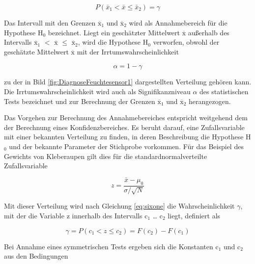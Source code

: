 \begin{equation}\label{eq:sixone}
P\left(\bar{x}_{1} <\bar{x}\le \bar{x}_{2} \right)=\gamma
\end{equation}

\noindent Das Intervall mit den Grenzen ${\overline{\mathrm{x}}}_1$ und ${\overline{\mathrm{x}}}_2$ wird als Annahmebereich f\"{u}r die Hypothese H${}_{0}$ bezeichnet. Liegt ein gesch\"{a}tzter Mittelwert $\overline{\mathrm{x}}$ au{\ss}erhalb des Intervalls ${\overline{\mathrm{x}}}_1$ $\mathrm{<}$ $\overline{\mathrm{x}}$ $\leq$ ${\overline{\mathrm{x}}}_2$, wird die Hypothese H${}_{0}$ verworfen, obwohl der gesch\"{a}tzte Mittelwert $\overline{\mathrm{x}}$ mit der Irrtumswahrscheinlichkeit

\begin{equation}\label{eq:sixtwo}
\alpha =1-\gamma
\end{equation}

\noindent zu der in Bild \ref{fig:DiagnoseFeuchtesensor1} dargestellten Verteilung geh\"{o}ren kann. Die Irrtumswahrscheinlichkeit wird auch als Signifikanzniveau $\alpha$ des statistischen Tests bezeichnet und zur Berechnung der Grenzen ${\overline{\mathrm{x}}}_1$ und ${\overline{\mathrm{x}}}_2$ herangezogen.\newline

\noindent Das Vorgehen zur Berechnung des Annahmebereiches entspricht weitgehend dem der Berechnung eines Konfidenzbereiches. Es beruht darauf, eine Zufallsvariable mit einer bekannten Verteilung zu finden, in deren Beschreibung die Hypothese H${}_{0}$ und der bekannte Parameter der Stichprobe vorkommen. F\"{u}r das Beispiel des Gewichts von Kleberaupen gilt dies f\"{u}r die standardnormalverteilte Zufallsvariable

\begin{equation}\label{eq:sixthree}
z=\dfrac{\bar{x}-\mu _{0}}{\sigma /\sqrt{N}}
\end{equation}

\noindent Mit dieser Verteilung wird nach Gleichung \eqref{eq:sixone} die Wahrscheinlichkeit $\gamma$, mit der die Variable z innerhalb des Intervalls c$_{1}$ {\dots} c$_{2}$ liegt, definiert als

\begin{equation}\label{eq:sixfour}
\gamma =P\left(c_{1} <z\le c_{2} \right)=F(c_{2})-F(c_{1})
\end{equation}

\noindent Bei Annahme eines symmetrischen Tests ergeben sich die Konstanten c$_{1}$ und c$_{2}$ aus den Bedingungen


